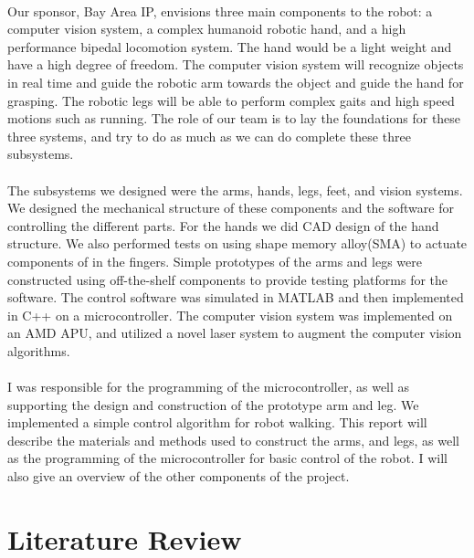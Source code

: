 \documentclass[titlepage,letterpaper,12pt]{article}
\begin{document}
\paragraph{}Our sponsor, Bay Area IP, envisions three main components to the
robot: a computer vision system, a complex humanoid robotic hand, and a high
performance bipedal locomotion system. The hand would be a light weight and have
a high degree of freedom. The computer vision system will recognize objects in
real time and guide the robotic arm towards the object and guide the hand for
grasping. The robotic legs will be able to perform complex gaits and high speed
motions such as running. The role of our team is to lay the foundations for
these three systems, and try to do as much as we can do complete these three
subsystems.

\paragraph{}The subsystems we designed were the arms, hands, legs, feet, and
vision systems.  We designed the mechanical structure of these components and
the software for controlling the different parts. For the hands we did CAD
design of the hand structure. We also performed tests on using shape memory
alloy(SMA) to actuate components of in the fingers. Simple prototypes of the
arms and legs were constructed using off-the-shelf components to provide testing
platforms for the software. The control software was simulated in MATLAB and
then implemented in C++ on a microcontroller. The computer vision system was
implemented on an AMD APU, and utilized a novel laser system to augment the
computer vision algorithms.

\paragraph{}I was responsible for the programming of the microcontroller, as
well as supporting the design and construction of the prototype arm and leg. We
implemented a simple control algorithm for robot walking. This report will
describe the materials and methods used to construct the arms, and legs, as well
as the programming of the microcontroller for basic control of the robot. I will
also give an overview of the other components of the project.

\section{Literature Review}
\end{document}
